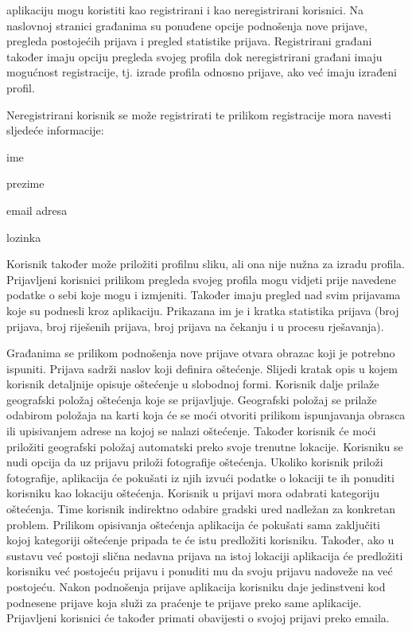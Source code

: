 		 aplikaciju mogu koristiti kao registrirani i kao neregistrirani korisnici. Na naslovnoj stranici građanima su ponuđene opcije podnošenja nove prijave, pregleda postojećih prijava i pregled statistike prijava. Registrirani građani također imaju opciju pregleda svojeg profila dok neregistrirani građani imaju mogućnost registracije, tj. izrade profila odnosno prijave, ako već imaju izrađeni profil.
		
		Neregistrirani korisnik se može registrirati te prilikom registracije mora navesti sljedeće informacije:
		\begin{packed_item}
			\item ime
			\item prezime
			\item email adresa
			\item lozinka
		\end{packed_item}  
		Korisnik također može priložiti profilnu sliku, ali ona nije nužna za izradu profila. Prijavljeni korisnici prilikom pregleda svojeg profila mogu vidjeti prije navedene podatke o sebi koje mogu i izmjeniti. Također imaju pregled nad svim prijavama koje su podnesli kroz aplikaciju. Prikazana im je i kratka statistika prijava (broj prijava, broj riješenih prijava, broj prijava na čekanju i u procesu rješavanja). 
		
		Građanima se prilikom podnošenja nove prijave otvara obrazac koji je potrebno ispuniti. Prijava sadrži naslov koji definira oštećenje. Slijedi kratak opis u kojem korisnik detaljnije opisuje oštećenje u slobodnoj formi. Korisnik dalje prilaže geografski položaj oštećenja koje se prijavljuje. Geografski položaj se prilaže odabirom položaja na karti koja će se moći otvoriti prilikom ispunjavanja obrasca ili upisivanjem adrese na kojoj se nalazi oštećenje. Također korisnik će moći priložiti geografski položaj automatski preko svoje trenutne lokacije. Korisniku se nudi opcija da uz prijavu priloži fotografije oštećenja. Ukoliko korisnik priloži fotografije, aplikacija će pokušati iz njih izvući podatke o lokaciji te ih ponuditi korisniku kao lokaciju oštećenja. Korisnik u prijavi mora odabrati kategoriju oštećenja. Time korisnik indirektno odabire gradski ured nadležan za konkretan problem. Prilikom opisivanja oštećenja aplikacija će pokušati sama zaključiti kojoj kategoriji oštećenje pripada te će istu predložiti korisniku. Također, ako u sustavu već postoji slična nedavna prijava na istoj lokaciji aplikacija će predložiti korisniku već postojeću prijavu i ponuditi mu da svoju prijavu nadoveže na već postojeću. Nakon podnošenja prijave aplikacija korisniku daje jedinstveni kod podnesene prijave koja služi za praćenje te prijave preko same aplikacije. Prijavljeni korisnici će također primati obavijesti o svojoj prijavi preko emaila.
		
